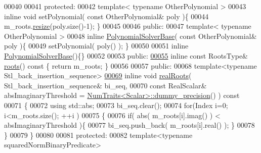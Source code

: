 \begin{DoxyCode}
00040 
00041   \textcolor{keyword}{protected}:
00042     \textcolor{keyword}{template}< \textcolor{keyword}{typename} OtherPolynomial >
00043     \textcolor{keyword}{inline} \textcolor{keywordtype}{void} setPolynomial( \textcolor{keyword}{const} OtherPolynomial& poly )\{
00044       m\_roots.\hyperlink{class_eigen_1_1_plain_object_base_a99d9054ee2d5a40c6e00ded0265e9cea}{resize}(poly.size()-1); \}
00045 
00046   \textcolor{keyword}{public}:
00047     \textcolor{keyword}{template}< \textcolor{keyword}{typename} OtherPolynomial >
00048     \textcolor{keyword}{inline} \hyperlink{class_eigen_1_1_polynomial_solver_base}{PolynomialSolverBase}( \textcolor{keyword}{const} OtherPolynomial& poly )\{
00049       setPolynomial( poly() ); \}
00050 
00051     \textcolor{keyword}{inline} \hyperlink{class_eigen_1_1_polynomial_solver_base}{PolynomialSolverBase}()\{\}
00052 
00053   \textcolor{keyword}{public}:
\hyperlink{class_eigen_1_1_polynomial_solver_base_a07bcd5339be5eacdf7e566d07d81bedb}{00055}     \textcolor{keyword}{inline} \textcolor{keyword}{const} RootsType& \hyperlink{class_eigen_1_1_polynomial_solver_base_a07bcd5339be5eacdf7e566d07d81bedb}{roots}()\textcolor{keyword}{ const }\{ \textcolor{keywordflow}{return} m\_roots; \}
00056 
00057   \textcolor{keyword}{public}:
00068     \textcolor{keyword}{template}<\textcolor{keyword}{typename} Stl\_back\_insertion\_sequence>
\hyperlink{class_eigen_1_1_polynomial_solver_base_a4ea3b29499623832a0ad7b2b3ab05597}{00069}     \textcolor{keyword}{inline} \textcolor{keywordtype}{void} \hyperlink{class_eigen_1_1_polynomial_solver_base_a4ea3b29499623832a0ad7b2b3ab05597}{realRoots}( Stl\_back\_insertion\_sequence& bi\_seq,
00070         \textcolor{keyword}{const} RealScalar& absImaginaryThreshold = 
      \hyperlink{group___core___module_struct_eigen_1_1_num_traits}{NumTraits<Scalar>::dummy\_precision}() )\textcolor{keyword}{ const}
00071 \textcolor{keyword}{    }\{
00072       \textcolor{keyword}{using} std::abs;
00073       bi\_seq.clear();
00074       \textcolor{keywordflow}{for}(Index i=0; i<m\_roots.size(); ++i )
00075       \{
00076         \textcolor{keywordflow}{if}( abs( m\_roots[i].imag() ) < absImaginaryThreshold )\{
00077           bi\_seq.push\_back( m\_roots[i].real() ); \}
00078       \}
00079     \}
00080 
00081   \textcolor{keyword}{protected}:
00082     \textcolor{keyword}{template}<\textcolor{keyword}{typename} squaredNormBinaryPredicate>

\end{DoxyCode}
